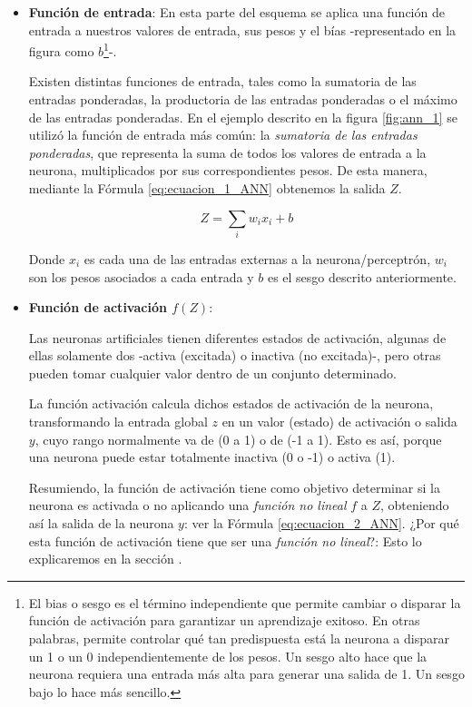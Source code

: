 \documentclass[12pt,a4paper]{article}
\begin{document}
\begin{sloppypar}
\begin{itemize}
\item \textbf{Función de entrada}: En esta parte del esquema se aplica una función de entrada a nuestros valores de entrada, sus pesos y el bías -representado en la figura como $b$\footnote{El bias o sesgo es el término independiente que permite cambiar o disparar la función de activación para garantizar un aprendizaje exitoso. En otras palabras, permite controlar qué tan predispuesta está la neurona a disparar un 1 o un 0 independientemente de los pesos. Un sesgo alto hace que la neurona requiera una entrada más alta para generar una salida de 1. Un sesgo bajo lo hace más sencillo.}-.

Existen distintas funciones de entrada, tales como la sumatoria de las entradas ponderadas, la productoria de las entradas ponderadas o el máximo de las entradas ponderadas\cite{ANN_23}. En el ejemplo descrito en la figura \ref{fig:ann_1} se utilizó la función de entrada más común: la \textit{sumatoria de las entradas ponderadas}, que representa la suma de todos los valores de entrada a la neurona, multiplicados por sus correspondientes pesos. De esta manera, mediante la Fórmula \ref{eq:ecuacion_1_ANN} obtenemos la salida $Z$.

\begin{equation}\label{eq:ecuacion_1_ANN}
Z=\sum_{i}w_{i}x_{i}+b
\end{equation}

Donde $x_i$ es cada una de las entradas externas a la neurona/perceptrón, $w_i$ son los pesos asociados a cada entrada y $b$ es el sesgo descrito anteriormente. 

\item \textbf{Función de activación $f(Z)$}:

Las neuronas artificiales tienen diferentes estados de activación, algunas de ellas solamente dos -activa (excitada) o inactiva (no excitada)-, pero otras pueden tomar cualquier valor dentro de un conjunto determinado.

La función activación calcula dichos estados de activación de la neurona, transformando la entrada global $z$ en un valor (estado) de activación o salida $y$, cuyo rango normalmente va de (0 a 1) o de (-1 a 1). Esto es así, porque una neurona puede estar totalmente inactiva (0 o -1) o activa (1)\cite{ANN_23}. 

Resumiendo, la función de activación tiene como objetivo determinar si la neurona es activada o no aplicando una \textit{función no lineal} $f$ a $Z$, obteniendo así la salida de la neurona $y$: ver la Fórmula \ref{eq:ecuacion_2_ANN}. ¿Por qué esta función de activación tiene que ser una \textit{función no lineal}?: Esto lo explicaremos en la sección \textit{}.


\end{itemize}
\end{sloppypar}
\end{document}
